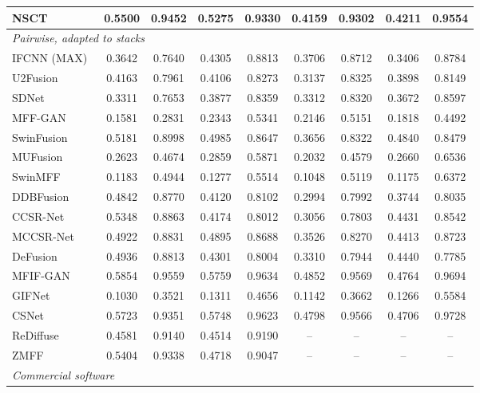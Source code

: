 \begin{table}[htbp]
{\begin{tabular}{lcccccccc}
NSCT~\cite{yang2007image} & 0.5500 & 0.9452 & 0.5275 & 0.9330 & 0.4159 & 0.9302 & 0.4211 & 0.9554 \\
\midrule
\multicolumn{9}{l}{\textit{Pairwise, adapted to stacks}} \\
IFCNN (MAX)~\cite{zhang2020ifcnn} & 0.3642 & 0.7640 & 0.4305 & 0.8813 & 0.3706 & 0.8712 & 0.3406 & 0.8784 \\
U2Fusion~\cite{xu2020u2fusion} & 0.4163 & 0.7961 & 0.4106 & 0.8273 & 0.3137 & 0.8325 & 0.3898 & 0.8149 \\
SDNet~\cite{zhang2021sdnet} & 0.3311 & 0.7653 & 0.3877 & 0.8359 & 0.3312 & 0.8320 & 0.3672 & 0.8597 \\
MFF-GAN~\cite{zhang2021mff} & 0.1581 & 0.2831 & 0.2343 & 0.5341 & 0.2146 & 0.5151 & 0.1818 & 0.4492 \\
SwinFusion~\cite{ma2022swinfusion} & 0.5181 & 0.8998 & 0.4985 & 0.8647 & 0.3656 & 0.8322 & 0.4840 & 0.8479 \\
MUFusion~\cite{cheng2023mufusion} & 0.2623 & 0.4674 & 0.2859 & 0.5871 & 0.2032 & 0.4579 & 0.2660 & 0.6536 \\
SwinMFF~\cite{xie2024swinmff} & 0.1183 & 0.4944 & 0.1277 & 0.5514 & 0.1048 & 0.5119 & 0.1175 & 0.6372 \\
DDBFusion~\cite{zhang2025ddbfusion} & 0.4842 & 0.8770 & 0.4120 & 0.8102 & 0.2994 & 0.7992 & 0.3744 & 0.8035 \\
CCSR-Net~\cite{ZHENG2025102974} & 0.5348 & 0.8863 & 0.4174 & 0.8012 & 0.3056 & 0.7803 & 0.4431 & 0.8542 \\
MCCSR-Net~\cite{ZHENG2025102974} & 0.4922 & 0.8831 & 0.4895 & 0.8688 & 0.3526 & 0.8270 & 0.4413 & 0.8723 \\
DeFusion~\cite{liang2022defusion} & 0.4936 & 0.8813 & 0.4301 & 0.8004 & 0.3310 & 0.7944 & 0.4440 & 0.7785 \\
MFIF-GAN~\cite{wang2021mfifgan} & 0.5854 & 0.9559 & 0.5759 & 0.9634 & 0.4852 & 0.9569 & 0.4764 & 0.9694 \\
GIFNet~\cite{cheng2025gifnet} & 0.1030 & 0.3521 & 0.1311 & 0.4656 & 0.1142 & 0.3662 & 0.1266 & 0.5584 \\
CSNet~\cite{csnet2026} & 0.5723 & 0.9351 & 0.5748 & 0.9623 & 0.4798 & 0.9566 & 0.4706 & 0.9728 \\
ReDiffuse~\cite{rediffuse2026} & 0.4581 & 0.9140 & 0.4514 & 0.9190 & -- & -- & -- & -- \\
ZMFF~\cite{hu2023zmff} & 0.5404 & 0.9338 & 0.4718 & 0.9047 & -- & -- & -- & -- \\
\midrule
\multicolumn{9}{l}{\textit{Commercial software}} \\

\end{tabular}}
\end{table}
